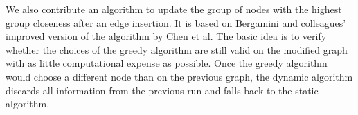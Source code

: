We also contribute an algorithm to update the group of nodes with the highest group closeness after an edge insertion. It is based on Bergamini and colleagues' improved version of the algorithm by Chen et al. The basic idea is to verify whether the choices of the greedy algorithm are still valid on the modified graph with as little computational expense as possible. Once the greedy algorithm would choose a different node than on the previous graph, the dynamic algorithm discards all information from the previous run and falls back to the static algorithm.